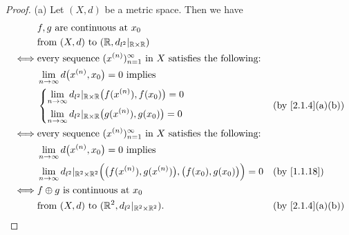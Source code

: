 \begin{proof}{(a)}
  Let \((X, d)\) be a metric space.
  Then we have
  \begin{align*}
         & f, g \text{ are continuous at } x_0                                                                                                                         \\
         & \text{from } (X, d) \text{ to } (\R, d_{l^2}|_{\R \times \R})                                                                                               \\
    \iff & \text{every sequence } (x^{(n)})_{n = 1}^\infty \text{ in } X \text{ satisfies the following:}                                                              \\
         & \lim_{n \to \infty} d\big(x^{(n)}, x_0\big) = 0 \text{ implies }                                                                                            \\
         & \begin{dcases}
             \lim_{n \to \infty} d_{l^2}|_{\R \times \R}\big(f(x^{(n)}), f(x_0)\big) = 0 \\
             \lim_{n \to \infty} d_{l^2}|_{\R \times \R}\big(g(x^{(n)}), g(x_0)\big) = 0
           \end{dcases}                                          &  & \text{(by \cref{2.1.4}(a)(b))}                                                                   \\
    \iff & \text{every sequence } (x^{(n)})_{n = 1}^\infty \text{ in } X \text{ satisfies the following:}                                                              \\
         & \lim_{n \to \infty} d\big(x^{(n)}, x_0\big) = 0 \text{ implies }                                                                                            \\
         & \lim_{n \to \infty} d_{l^2}|_{\R^2 \times \R^2}\Big(\big(f(x^{(n)}), g(x^{(n)})\big), \big(f(x_0), g(x_0)\big)\Big) = 0 &  & \by{1.1.18}                    \\
    \iff & f \oplus g \text{ is continuous at } x_0                                                                                                                    \\
         & \text{from } (X, d) \text{ to } (\R^2, d_{l^2}|_{\R^2 \times \R^2}).                                                    &  & \text{(by \cref{2.1.4}(a)(b))}
  \end{align*}
\end{proof}

